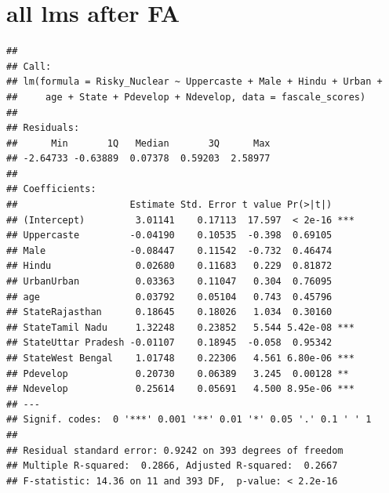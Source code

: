 \documentclass[
]{article}
\begin{document}
\hypertarget{all-lms-after-fa}{%
\section{all lms after FA}\label{all-lms-after-fa}}

\begin{verbatim}
## 
## Call:
## lm(formula = Risky_Nuclear ~ Uppercaste + Male + Hindu + Urban + 
##     age + State + Pdevelop + Ndevelop, data = fascale_scores)
## 
## Residuals:
##      Min       1Q   Median       3Q      Max 
## -2.64733 -0.63889  0.07378  0.59203  2.58977 
## 
## Coefficients:
##                    Estimate Std. Error t value Pr(>|t|)    
## (Intercept)         3.01141    0.17113  17.597  < 2e-16 ***
## Uppercaste         -0.04190    0.10535  -0.398  0.69105    
## Male               -0.08447    0.11542  -0.732  0.46474    
## Hindu               0.02680    0.11683   0.229  0.81872    
## UrbanUrban          0.03363    0.11047   0.304  0.76095    
## age                 0.03792    0.05104   0.743  0.45796    
## StateRajasthan      0.18645    0.18026   1.034  0.30160    
## StateTamil Nadu     1.32248    0.23852   5.544 5.42e-08 ***
## StateUttar Pradesh -0.01107    0.18945  -0.058  0.95342    
## StateWest Bengal    1.01748    0.22306   4.561 6.80e-06 ***
## Pdevelop            0.20730    0.06389   3.245  0.00128 ** 
## Ndevelop            0.25614    0.05691   4.500 8.95e-06 ***
## ---
## Signif. codes:  0 '***' 0.001 '**' 0.01 '*' 0.05 '.' 0.1 ' ' 1
## 
## Residual standard error: 0.9242 on 393 degrees of freedom
## Multiple R-squared:  0.2866, Adjusted R-squared:  0.2667 
## F-statistic: 14.36 on 11 and 393 DF,  p-value: < 2.2e-16
\end{verbatim}
\end{document}
